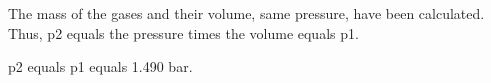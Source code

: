 The mass of the gases and their volume, same pressure, have been calculated. Thus, p2 equals the pressure times the volume equals p1.

p2 equals p1 equals 1.490 bar.
